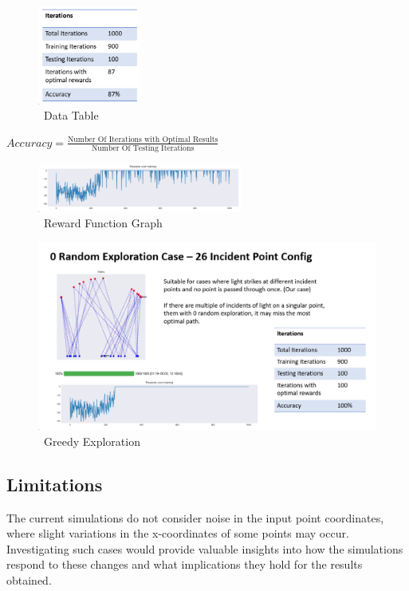 \documentclass[12pt,a4paper,twoside]{report}
\begin{document}
\begin{figure}[h]
	\centering
	\includegraphics[width=0.3\textwidth]{26table}
	\caption{~Data Table}
	\label{fig:8table}
\end{figure}
\centering
$Accuracy = \frac{\text{Number Of Iterations with Optimal Results}}{\text{Number Of Testing Iterations}}$
\begin{figure}[h]
	\centering
	\includegraphics[width=0.6\textwidth]{26rewardfunc}
	\caption{~Reward Function Graph}
	\label{fig:reward}
\end{figure}

\newpage

\begin{figure}
	\centering
	\includegraphics[width=1\linewidth]{26pt1}
	\caption{~Greedy Exploration}
	\label{fig:26pt1}
\end{figure}
\subsection{Limitations}
\justifying
The current simulations do not consider noise in the input point coordinates, where slight variations in the x-coordinates of some points may occur. Investigating such cases would provide valuable insights into how the simulations respond to these changes and what implications they hold for the results obtained.
\end{document}
